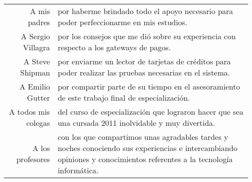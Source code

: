 \begin{center}
\begin{tabular}{rp{65mm}}
A mis padres & por haberme brindado todo el apoyo necesario para poder perfeccionarme en mis estudios.\\
A Sergio Villagra & por los consejos que me di\'o sobre su experiencia con respecto a los gateways de pagos.\\
A Steve Shipman & por enviarme un lector de tarjetas de cr\'editos para poder realizar las pruebas necesarias en el sistema.\\
A Emilio Gutter & por compartir parte de su tiempo en el asesoramiento de este trabajo final de especializaci\'on.\\
A todos mis colegas & del curso de especializaci\'on que lograron hacer que sea una cursada 2011 inolvidable y muy divertida.\\
A los profesores & con los que compartimos unas agradables tardes y noches conociendo sus experiencias e intercambiando opiniones y conocimientos referentes a la tecnolog\'ia inform\'atica.\\
\end{tabular}
\end{center}


